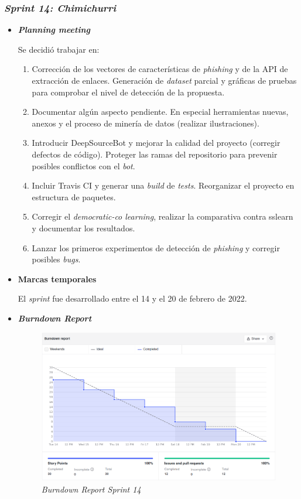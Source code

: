 \subsubsection{\textit{Sprint 14: Chimichurri}}
\begin{itemize}
	\item \textbf{\textit{Planning meeting}}
	
	Se decidió trabajar en:
	\begin{enumerate}
		\item Corrección de los vectores de características de \textit{phishing} y de la API de extracción de enlaces. Generación de \textit{dataset} parcial y gráficas de pruebas para comprobar el nivel de detección de la propuesta.
		\item Documentar algún aspecto pendiente. En especial herramientas nuevas, anexos y el proceso de minería de datos (realizar ilustraciones).
		\item Introducir DeepSourceBot y mejorar la calidad del proyecto (corregir defectos de código). Proteger las ramas del repositorio para prevenir posibles conflictos con el \textit{bot}.
		\item Incluir Travis CI y generar una \textit{build} de \textit{tests}. Reorganizar el proyecto en estructura de paquetes.
		\item Corregir el \textit{democratic-co learning}, realizar la comparativa contra sslearn y documentar los resultados. 
		\item Lanzar los primeros experimentos de detección de \textit{phishing} y corregir posibles \textit{bugs}.
	\end{enumerate}

	\item \textbf{Marcas temporales}		
	
	El \textit{sprint} fue desarrollado entre el 14 y el 20 de febrero de 2022.
	
	
	\item \textbf{\textit{Burndown Report}}
	
		\begin{figure}[h]
		\caption[\textit{Sprint} 14: \textit{burndown report}]{\textit{Burndown Report Sprint 14}}
		\centering
		\includegraphics[width=\textwidth]{../img/anexos/bdr/s14_bdr}
	\end{figure}


\end{itemize}
